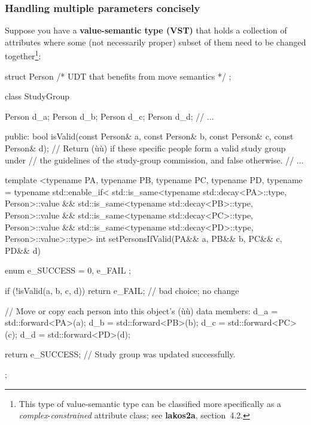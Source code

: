 \subsubsection[Handling multiple parameters concisely]{Handling multiple parameters concisely}\label{handling-multiple-parameters-concisely}

Suppose you have a \textbf{value-semantic type (VST)} that holds a
collection of attributes where some (not necessarily proper) subset of
them need to be changed together{\cprotect\footnote{This type of
value-semantic type can be classified more specifically as a
\emph{complex}-\emph{constrained} attribute class; see \textbf{lakos2a}, section~4.2.}}:

\begin{emcppslisting}
struct Person { /* UDT that benefits from move semantics */ };

class StudyGroup
{
    Person d_a;
    Person d_b;
    Person d_c;
    Person d_d;
    // ...

public:
    bool isValid(const Person& a, const Person& b, const Person& c, const Person& d);
        // Return (ù{}ù) if these specific people form a valid study group under
        // the guidelines of the study-group commission, and false otherwise.
    // ...

    template <typename PA, typename PB, typename PC, typename PD,
        typename = typename std::enable_if<
            std::is_same<typename std::decay<PA>::type, Person>::value &&
            std::is_same<typename std::decay<PB>::type, Person>::value &&
            std::is_same<typename std::decay<PC>::type, Person>::value &&
            std::is_same<typename std::decay<PD>::type, Person>::value>::type>
    int setPersonsIfValid(PA&& a, PB&& b, PC&& c, PD&& d)
    {
        enum { e_SUCCESS = 0, e_FAIL };

        if (!isValid(a, b, c, d))
        {
            return e_FAIL;  // bad choice; no change
        }

        // Move or copy each person into this object's (ù{}ù) data members:
        d_a = std::forward<PA>(a);
        d_b = std::forward<PB>(b);
        d_c = std::forward<PC>(c);
        d_d = std::forward<PD>(d);

        return e_SUCCESS;  // Study group was updated successfully.
    }
};
\end{emcppslisting}

